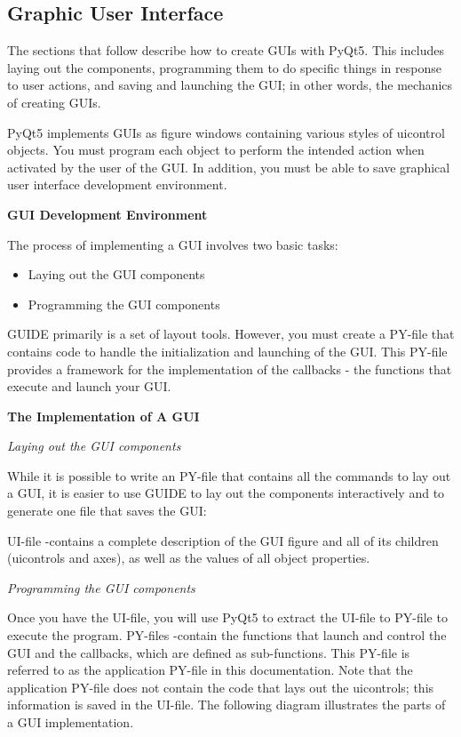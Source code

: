 \documentclass[journal, twocolumn]{IEEEtran}
\begin{document}
\subsection{Graphic User Interface}
\label{gui}

The sections that follow describe how to create GUIs with PyQt5. This includes laying out the components, programming them to do specific things in response to user actions, and saving and launching the GUI; in other words, the mechanics of creating GUIs.

PyQt5 implements GUIs as figure windows containing various styles of uicontrol objects. You must program each object to perform the intended action when activated by the user of the GUI. In addition, you must be able to save graphical user interface development environment.

\textbf{GUI Development Environment}

The process of implementing a GUI involves two basic tasks:
\begin{itemize}
	\item Laying out the GUI components 
	\item Programming the GUI components
\end{itemize}
GUIDE primarily is a set of layout tools. However, you must create a PY-file that contains code to handle the initialization and launching of the GUI. This PY-file provides a framework for the implementation of the callbacks - the functions that execute and launch your GUI. 

\textbf{The Implementation of A GUI}

\textit{Laying out the GUI components}

While it is possible to write an PY-file that contains all the commands to lay out a GUI, it is easier to use GUIDE to lay out the components interactively and to generate one file that saves the GUI:

UI-file -contains a complete description of the GUI figure and all of its children (uicontrols and axes), as well as the values of all object properties.

\textit{Programming the GUI components} 

Once you have the UI-file, you will use PyQt5 to extract the UI-file to PY-file to execute the program. PY-files -contain the functions that launch and control the GUI and the callbacks, which are defined as sub-functions. This PY-file is referred to as the application PY-file in this documentation. Note that the application PY-file does not contain the code that lays out the uicontrols; this information is saved in the UI-file. The following diagram illustrates the parts of a GUI implementation.
\end{document}
